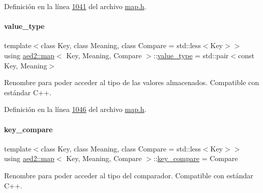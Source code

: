 Definición en la línea \hyperlink{map_8h_source_l01041}{1041} del archivo \hyperlink{map_8h_source}{map.\+h}.

\mbox{\label{classaed2_1_1map_a719db98e0ff9a837610f76be33264680_a719db98e0ff9a837610f76be33264680}} 
\paragraph{\texorpdfstring{value\+\_\+type}{value\_type}}
{\footnotesize\ttfamily template$<$class Key, class Meaning, class Compare = std\+::less$<$\+Key$>$$>$ \\
using \hyperlink{classaed2_1_1map}{aed2\+::map}$<$ Key, Meaning, Compare $>$\+::\hyperlink{classaed2_1_1map_a719db98e0ff9a837610f76be33264680_a719db98e0ff9a837610f76be33264680}{value\+\_\+type} =  std\+::pair$<$const Key, Meaning$>$}



Renombre para poder acceder al tipo de las valores almacenados. Compatible con estándar C++. 



Definición en la línea \hyperlink{map_8h_source_l01046}{1046} del archivo \hyperlink{map_8h_source}{map.\+h}.

\mbox{\label{classaed2_1_1map_a3efa081d3379ab76f33a5ef9fe697523_a3efa081d3379ab76f33a5ef9fe697523}} 
\paragraph{\texorpdfstring{key\+\_\+compare}{key\_compare}}
{\footnotesize\ttfamily template$<$class Key, class Meaning, class Compare = std\+::less$<$\+Key$>$$>$ \\
using \hyperlink{classaed2_1_1map}{aed2\+::map}$<$ Key, Meaning, Compare $>$\+::\hyperlink{classaed2_1_1map_a3efa081d3379ab76f33a5ef9fe697523_a3efa081d3379ab76f33a5ef9fe697523}{key\+\_\+compare} =  Compare}



Renombre para poder acceder al tipo del comparador. Compatible con estándar C++. 



